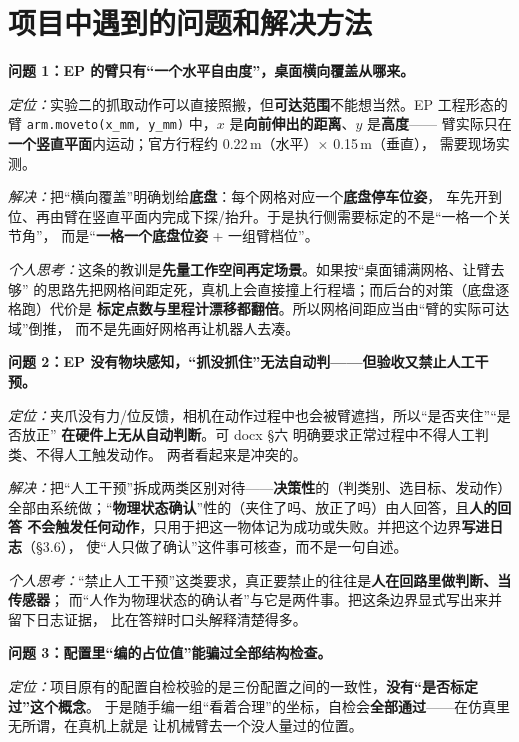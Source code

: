 \documentclass[12pt,a4paper]{ctexart}
\begin{document}
\section{项目中遇到的问题和解决方法}

\textbf{问题 1：EP 的臂只有“一个水平自由度”，桌面横向覆盖从哪来。}

\textit{定位：}实验二的抓取动作可以直接照搬，但\textbf{可达范围}不能想当然。EP 工程形态的臂
\texttt{arm.moveto(x\_mm, y\_mm)} 中，$x$ 是\textbf{向前伸出的距离}、$y$ 是\textbf{高度}——
臂实际只在\textbf{一个竖直平面}内运动；官方行程约 0.22\,m（水平）$\times$ 0.15\,m（垂直），
需要现场实测。

\textit{解决：}把“横向覆盖”明确划给\textbf{底盘}：每个网格对应一个\textbf{底盘停车位姿}，
车先开到位、再由臂在竖直平面内完成下探/抬升。于是执行侧需要标定的不是“一格一个关节角”，
而是“\textbf{一格一个底盘位姿} + 一组臂档位”。

\textit{个人思考：}这条的教训是\textbf{先量工作空间再定场景}。如果按“桌面铺满网格、让臂去够”
的思路先把网格间距定死，真机上会直接撞上行程墙；而后台的对策（底盘逐格跑）代价是
\textbf{标定点数与里程计漂移都翻倍}。所以网格间距应当由“臂的实际可达域”倒推，
而不是先画好网格再让机器人去凑。

\medskip
\textbf{问题 2：EP 没有物块感知，“抓没抓住”无法自动判——但验收又禁止人工干预。}

\textit{定位：}夹爪没有力/位反馈，相机在动作过程中也会被臂遮挡，所以“是否夹住”“是否放正”
\textbf{在硬件上无从自动判断}。可 docx §六 明确要求正常过程中不得人工判类、不得人工触发动作。
两者看起来是冲突的。

\textit{解决：}把“人工干预”拆成两类区别对待——\textbf{决策性}的（判类别、选目标、发动作）
全部由系统做；“\textbf{物理状态确认}”性的（夹住了吗、放正了吗）由人回答，且\textbf{人的回答
不会触发任何动作}，只用于把这一物体记为成功或失败。并把这个边界\textbf{写进日志}（§3.6），
使“人只做了确认”这件事可核查，而不是一句自述。

\textit{个人思考：}“禁止人工干预”这类要求，真正要禁止的往往是\textbf{人在回路里做判断、当传感器}；
而“人作为物理状态的确认者”与它是两件事。把这条边界显式写出来并留下日志证据，
比在答辩时口头解释清楚得多。

\medskip
\textbf{问题 3：配置里“编的占位值”能骗过全部结构检查。}

\textit{定位：}项目原有的配置自检校验的是三份配置之间的一致性，\textbf{没有“是否标定过”这个概念}。
于是随手编一组“看着合理”的坐标，自检会\textbf{全部通过}——在仿真里无所谓，在真机上就是
让机械臂去一个没人量过的位置。
\end{document}
